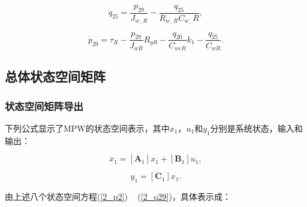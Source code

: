 \begin{enumerate}
\begin{equation}\label{2_q25}
\dot{q}_{25}=\frac{p_{29}}{J_{w_{-} R}}-\frac{q_{25}}{R_{w_{-} R} C_{w_{-}} R},
\end{equation}

\begin{equation}\label{2_q29}
\dot{p}_{29}
=
\tau_{R}-\frac{p_{29}}{J_{w R}} R_{g R}
-
\frac{q_{20}}{C_{wc R}} k_{1}
-
\frac{q_{25}}{C_{w R}}.
\end{equation}

\end{enumerate}

\subsection{总体状态空间矩阵}

\subsubsection{状态空间矩阵导出}

下列公式显示了MPW的状态空间表示，其中$ x_1$，$u_1$和$y_1$分别是系统状态，输入和输出：

\begin{equation}\label{2_dot_x1}
\dot{x}_1 =[\mathbf{A}_1] x_1+[\mathbf{B}_1] u_1,
\end{equation}

\begin{equation}\label{2_y1}
y_1 =[\mathbf{C}_1] x_1.
\end{equation}

由上述八个状态空间方程(\ref{2_p2}) ~ (\ref{2_q29})，具体表示成：

